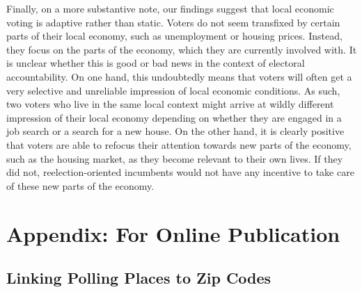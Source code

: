 \documentclass[12pt,a4paper]{article}
\begin{document}
	Finally, on a more substantive note, our findings suggest that local economic voting is adaptive rather than static. Voters do not seem transfixed by certain parts of their local economy, such as unemployment or housing prices. Instead, they focus on the parts of the economy, which they are currently involved with. It is unclear whether this is good or bad news in the context of electoral accountability. On one hand, this undoubtedly means that voters will often get a very selective and unreliable impression of  local economic conditions. As such, two voters who live in the same local context might arrive at wildly different impression of their local economy depending on whether they are engaged in a job search or a search for a new house.  On the other hand,  it is clearly positive that voters are able to refocus their attention towards new parts of the economy, such as the housing market, as they become relevant to their own lives. If they did not, reelection-oriented incumbents would not have any incentive to take care of these new parts of the economy.
	

	
	\clearpage
	
	\singlespacing
	
	
	
	
	\newpage
	
	\appendix
	\section*{Appendix: For Online Publication}
		\onehalfspacing
	\renewcommand{\thesubsection}{\Alph{subsection}}
	\renewcommand{\thetable}{\Alph{subsection}\arabic{table}}
	\renewcommand{\thefigure}{\Alph{subsection}\arabic{figure}}
	
	\localtableofcontents

	
	\newpage
	
	\subsection{Linking Polling Places to Zip Codes}\label{app_linking}
	
\end{document}
